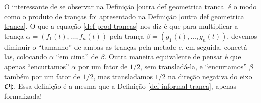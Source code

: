 	\par\vspace{0.3cm} O interessante de se observar na Definição \eqref{outra def geometrica tranca} é 
	o modo como o produto de tranças foi apresentado na Definição \eqref{outra def geometrica tranca}. 
	O que a equação \eqref{def prod trancas} nos diz é que para multiplicar a trança 
	$\alpha = ( f_1(t), \dots, f_n(t) )$ pela trança $\beta = ( g_1(t), \dots, g_n(t) )$, devemos 
	diminuir o ``tamanho'' de ambas as tranças pela metade e, em seguida, conectá-las, colocando $\alpha$ 
	``em cima'' de $\beta$. Outra maneira equivalente de pensar é que apenas ``encurtamos'' $\alpha$ por 
	um fator de $1/2$, sem transladá-la, e ``encurtamos'' $\beta$ também por um fator de $1/2$, mas 
	transladamos $1/2$ na direção negativa do eixo $\cal{O}z$. Essa definição é a mesma que a 
	Definição \eqref{def informal tranca}, apenas formalizada!